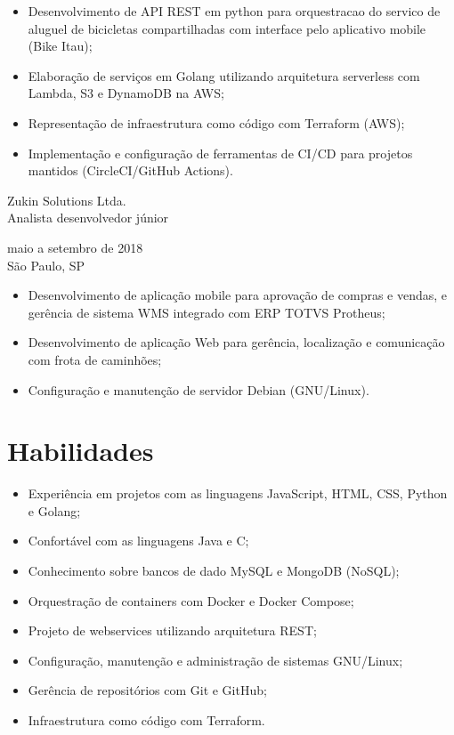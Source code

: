 \documentclass{article}
\begin{document}
\begin{itemize}
    \item Desenvolvimento de API REST em python para orquestracao do servico de
    aluguel de bicicletas compartilhadas com interface pelo aplicativo mobile
    (Bike Itau);
    \item Elaboração de serviços em Golang utilizando arquitetura serverless com
    Lambda, S3 e DynamoDB na AWS;
    \item Representação de infraestrutura como código com Terraform (AWS);
    \item Implementação e configuração de ferramentas de CI/CD para projetos
    mantidos (CircleCI/GitHub Actions).
\end{itemize}

\begin{multicols}{2}
    \noindent
    \begin{flushleft}
        Zukin Solutions Ltda. \\
        Analista desenvolvedor júnior
    \end{flushleft}
    \columnbreak
    \begin{flushright}
        maio a setembro de 2018 \\
        São Paulo, SP
    \end{flushright}
\end{multicols}

\begin{itemize}
    \item Desenvolvimento de aplicação mobile para aprovação de compras e
    vendas, e gerência de sistema WMS integrado com ERP TOTVS Protheus;
    \item Desenvolvimento de aplicação Web para gerência, localização e
    comunicação com frota de caminhões;
    \item Configuração e manutenção de servidor Debian (GNU/Linux).
\end{itemize}

\section{Habilidades}

\begin{itemize}
    \item Experi\^{e}ncia em projetos com as linguagens JavaScript, HTML, CSS,
    Python e Golang;
    \item Confortável com as linguagens Java e C;
    \item Conhecimento sobre bancos de dado MySQL e MongoDB (NoSQL);
    \item Orquestração de containers com Docker e Docker Compose;
    \item Projeto de webservices utilizando arquitetura REST;
    \item Configuração, manutenção e administração de sistemas GNU/Linux;
    \item Gerência de repositórios com Git e GitHub;
    \item Infraestrutura como código com Terraform.
\end{itemize}
\end{document}
